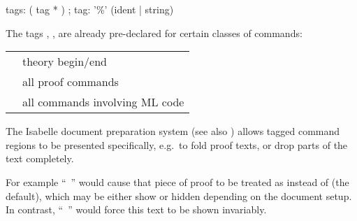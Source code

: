 \begin{isabellebody}
\begin{isamarkuptext}
  \begin{rail}
    tags: ( tag * )
    ;
    tag: '\%' (ident | string)
  \end{rail}

  The tags , ,  are already
  pre-declared for certain classes of commands:

 \medskip

  \begin{tabular}{ll}
    \isa{{\isachardoublequote}theory{\isachardoublequote}} & theory begin/end \\
    \isa{{\isachardoublequote}proof{\isachardoublequote}} & all proof commands \\
    \isa{{\isachardoublequote}ML{\isachardoublequote}} & all commands involving ML code \\
  \end{tabular}

  \medskip The Isabelle document preparation system (see also
  \cite{isabelle-sys}) allows tagged command regions to be presented
  specifically, e.g.\ to fold proof texts, or drop parts of the text
  completely.

  For example ``\hyperlink{command.by}{\mbox{}}~'' would
  cause that piece of proof to be treated as  instead
  of  (the default), which may be either show or hidden
  depending on the document setup.  In contrast, ``\hyperlink{command.by}{\mbox{}}~'' would force this text to be shown
  invariably.


\end{isamarkuptext}
\end{isabellebody}
